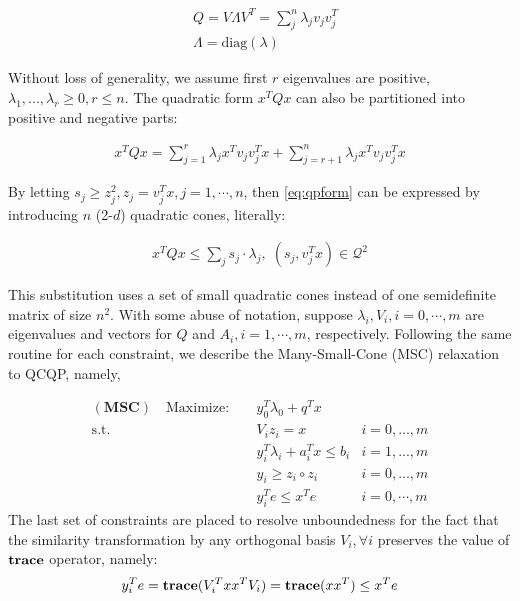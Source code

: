 \documentclass[../main]{subfiles}
\begin{document}
\begin{equation}
  \begin{aligned}
     & Q = V\Lambda V ^T =\sum_j^n \lambda_j v_j  v_j^T \\
     & \Lambda = \mathrm{diag}(\lambda)
  \end{aligned}
\end{equation}

Without loss of generality, we assume first \(r\) eigenvalues are positive, \(\lambda_1, ..., \lambda_r \ge 0, r\le n \). The quadratic form \(x^TQx\) can also be partitioned into positive and negative parts:

\begin{equation}\label{eq:qpform}
  \begin{aligned}
    x^TQx = \sum_{j=1}^r \lambda_j x^T v_j v_j^T x + \sum_{j=r+1}^n \lambda_j x^T v_j v_j^T x
  \end{aligned}
\end{equation}

By letting \(s_j \ge z_j^2, z_j = v_j^T x, j = 1, \cdots, n\), then \eqref{eq:qpform} can be expressed by introducing \(n\) (2-\(d\)) quadratic cones, literally:

\begin{equation}
  \begin{aligned}
    x^TQx \le \sum_j s_j \cdot \lambda_j,\; (s_j, v^T_j x) \in \mathcal{Q}^2
  \end{aligned}
\end{equation}

This substitution uses a set of small quadratic cones instead of one semidefinite matrix of size \(n^2\). With some abuse of notation, suppose \(\lambda_i, V_i, i = 0, \cdots, m\) are eigenvalues and vectors for \(Q\) and \(A_i, i = 1,
\cdots, m\), respectively. Following the same routine for each constraint, we describe the Many-Small-Cone (MSC) relaxation to QCQP, namely,

\begin{equation}\label{eq.rel.msc}
  \begin{aligned}
    (\mathbf{MSC}) \quad \mathrm{Maximize: }\quad & y_0 ^T\lambda_0 + q^Tx                              \\
    \mathrm{s.t.} \quad                           & V_i z_i = x                        & i=0,...,m      \\
                                                  & y_i ^T\lambda_i  + a_i^Tx  \le b_i & i=1,...,m      \\
                                                  & y_i \ge z_i \circ z_i              & i=0,...,m      \\
                                                  & y_i^Te \le x^Te                    & i=0, \cdots, m
  \end{aligned}
\end{equation}
The last set of constraints are placed to resolve unboundedness for the fact that the similarity transformation by any orthogonal basis \(V_i, \forall i\) preserves the value of \(\mathbf{trace}\) operator, namely:
\begin{equation}
  y_i^Te = \mathbf{trace}( V_i^Txx^T V_i) = \mathbf{trace} (xx^T) \le x^Te
\end{equation}
\end{document}
